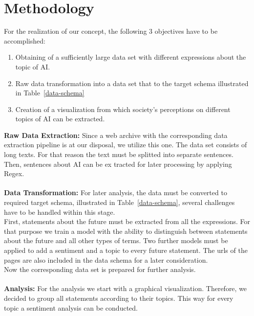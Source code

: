 \section{Methodology}

For the realization of our concept, the following 3 objectives have to be accomplished:

\begin{enumerate}
    \item Obtaining of a sufficiently large data set with different expressions about the topic of AI.
    \item Raw data transformation into a data set that to the target schema illustrated in Table~\ref{data-schema}
    \item Creation of a visualization from which society's perceptions on different topics of AI can be extracted.
\end{enumerate}%
%
%
\textbf{Raw Data Extraction:}
Since a web archive with the corresponding data extraction pipeline is at our disposal, we utilize this one.
The data set consists of long texts.
For that reason the text must be splitted into separate sentences.
Then, sentences about AI can be ex tracted for later processing by applying Regex.
\\
\\
%
\textbf{Data Transformation:}
For later analysis, the data must be converted to required target schema, illustrated in Table~\ref{data-schema}, several challenges have to be handled within this stage.
\\
First, statements about the future must be extracted from all the expressions.
For that purpose we train a model with the ability to distinguish between statements about the future and all other types of terms.
Two further models must be applied to add a sentiment and a topic to every future statement.
The urls of the pages are also included in the data schema for a later consideration.
\\
Now the corresponding data set is prepared for further analysis.
\\
\\
\textbf{Analysis:}
For the analysis we start with a graphical visualization.
Therefore, we decided to group all statements according to their topics.
This way for every topic a sentiment analysis can be conducted.


